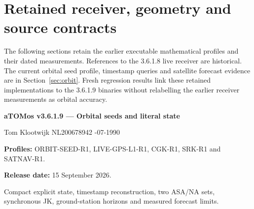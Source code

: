 \documentclass[11pt,a4paper]{article}
\begin{document}
\section*{Retained receiver, geometry and source contracts}
The following sections retain the earlier executable mathematical profiles and
their dated measurements. References to the 3.6.1.8 live receiver are historical.
The current orbital seed profile, timestamp queries and satellite forecast
evidence are in Section~\ref{sec:orbit}. Fresh regression results link these
retained implementations to the 3.6.1.9 binaries without relabelling the earlier
receiver measurements as orbital accuracy.

\vfill\begin{panel}
\textbf{aTOMos v3.6.1.9 --- Orbital seeds and literal state}\par
Tom Klootwijk \quad NL200678942 -07-1990\par
\textbf{Profiles:} ORBIT-SEED-R1, LIVE-GPS-L1-R1, CGK-R1, SRK-R1 and SATNAV-R1.\par
\textbf{Release date:} 15 September 2026.\par
Compact explicit state, timestamp reconstruction, two ASA/NA sets, synchronous
JK, ground-station horizons and measured forecast limits.
\end{panel}
\end{document}
